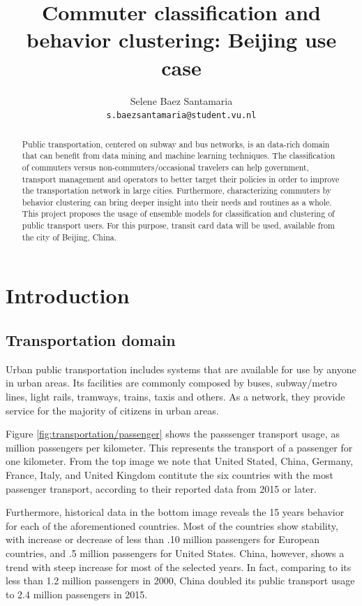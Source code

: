 \documentclass{article}
\title{Commuter classification and behavior clustering: Beijing use case}
\author{
  Selene Baez  Santamaria \\
  \texttt{s.baezsantamaria@student.vu.nl}
}
\begin{document}

\maketitle

\begin{abstract}
  Public transportation, centered on subway and bus networks, is an data-rich domain that can benefit from data mining and machine learning techniques. The classification of commuters versus non-commuters/occasional travelers can help government, transport management and operators to better target their policies in order to improve the transportation network in large cities. Furthermore, characterizing commuters by behavior clustering can bring deeper insight into their needs and routines as a whole. 
  This project proposes the usage of ensemble models for classification and clustering of public transport users. For this purpose, transit card data will be used, available from the city of Beijing, China. 
\end{abstract}

\newpage

\tableofcontents

\newpage
\section{Introduction}

\subsection{Transportation domain}
Urban public transportation includes systems that are available for use by anyone in urban areas. Its facilities are commonly composed by buses, subway/metro lines, light rails, tramways, trains, taxis and others. As a network, they provide service for the majority of citizens in urban areas.\citep{vuchic1900urban}

Figure \ref{fig:transportation/passenger} shows the passsenger transport usage, as million passengers per kilometer. This represents the transport of a passenger for one kilometer. From the top image we note that United Stated, China, Germany, France, Italy, and United Kingdom contitute the six countries with the most passenger transport, according to their reported data from 2015 or later.\cite{OECD2017passenger} 

Furthermore, historical data in the bottom image reveals the 15 years behavior for each of the aforementioned countries. Most of the countries show stability, with increase or decrease of less than .10 million passengers for European countries, and .5 million passengers for United States. China, however, shows a trend with steep increase for most of the selected years. In fact, comparing to its less than 1.2 million passengers in 2000, China doubled its public transport usage to 2.4 million passengers in 2015. 
\end{document}
